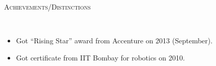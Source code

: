 \documentclass[9pt]{article}
\newenvironment{changemargin}[2]{%
  \begin{list}{}{%
    \setlength{\topsep}{0pt}%
    \setlength{\leftmargin}{#1}%
    \setlength{\rightmargin}{#2}%
    \setlength{\listparindent}{\parindent}%
    \setlength{\itemindent}{\parindent}%
    \setlength{\parsep}{\parskip}%
  }%
  \item[]}{\end{list}
}
\newcommand{\lineover}{
	\begin{changemargin}{-0.05in}{-0.05in}
		\vspace*{-8pt}
		\hrulefill \\
		\vspace*{-2pt}
	\end{changemargin}
}
\newcommand{\header}[1]{
	\begin{changemargin}{-0.5in}{-0.5in}
		\scshape{#1}\\
  	\lineover
	\end{changemargin}
}
\newenvironment{body} {
	\vspace*{-16pt}
	\begin{changemargin}{-0.25in}{-0.5in}
  }
	{\end{changemargin}
}
\begin{document}
\smallskip

\header{Achievements/Distinctions}
\begin{body}
	\vspace{14pt}
	\begin{itemize} \itemsep -0pt  %
            \item   Got ``Rising Star'' award from Accenture on 2013 (September).
            \item   Got certificate from IIT Bombay for robotics on 2010.
	\end{itemize}
\end{body}

\smallskip
\end{document}
